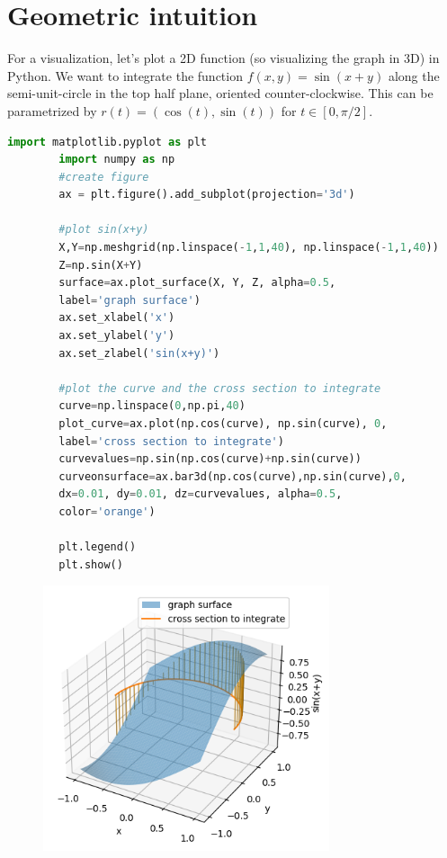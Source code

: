 \documentclass[11pt,openany]{book}
\begin{document}
	\section*{Geometric intuition}
	For a visualization, let's plot a 2D function (so visualizing the graph in 3D) in Python. We want to integrate the function $f(x,y)=\sin(x+y)$ along the semi-unit-circle in the top half plane, oriented counter-clockwise. This can be parametrized by $r(t) = (\cos(t), \sin(t))$ for $t\in [0,\pi / 2]$. 
	\begin{lstlisting}[language=Python]
		import matplotlib.pyplot as plt
		import numpy as np
		#create figure
		ax = plt.figure().add_subplot(projection='3d')
		
		#plot sin(x+y)
		X,Y=np.meshgrid(np.linspace(-1,1,40), np.linspace(-1,1,40))
		Z=np.sin(X+Y)
		surface=ax.plot_surface(X, Y, Z, alpha=0.5,
		label='graph surface')
		ax.set_xlabel('x')
		ax.set_ylabel('y')
		ax.set_zlabel('sin(x+y)')
		
		#plot the curve and the cross section to integrate
		curve=np.linspace(0,np.pi,40)
		plot_curve=ax.plot(np.cos(curve), np.sin(curve), 0,
		label='cross section to integrate')
		curvevalues=np.sin(np.cos(curve)+np.sin(curve))
		curveonsurface=ax.bar3d(np.cos(curve),np.sin(curve),0,
		dx=0.01, dy=0.01, dz=curvevalues, alpha=0.5,
		color='orange')
		
		plt.legend()
		plt.show()
	\end{lstlisting}
	\begin{figure} 
		\includegraphics[width=0.75\textwidth]{sin.png}
	\end{figure}
	
	
\end{document}
